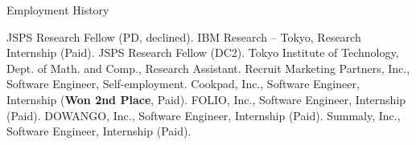 \begin{rubric}{Employment History}

  \entry*[2023.04 -- 2023.4] JSPS Research Fellow (PD, declined).
  \entry*[2021.08 -- 2021.10] IBM Research -- Tokyo, Research Internship (Paid).
  \entry*[2021.04 -- 2023.3] JSPS Research Fellow (DC2).
  \entry*[2020.11 -- 2023.3] Tokyo Institute of Technology, Dept. of Math. and Comp.,
  Research Assistant.
  \entry*[2018.6 -- 2019.2] Recruit Marketing Partners, Inc., Software Engineer,
  Self-employment.
  \entry*[2018.8] Cookpad, Inc., Software Engineer, Internship (\textbf{Won 2nd
    Place}, Paid).
  \entry*[2017.4 -- 2018.3] FOLIO, Inc., Software Engineer, Internship (Paid).
  \entry*[2016.8 -- 2017.3] DOWANGO, Inc., Software Engineer, Internship (Paid).
  \entry*[2016.1 -- 2016.6] Summaly, Inc., Software Engineer, Internship (Paid).
%
\end{rubric}
